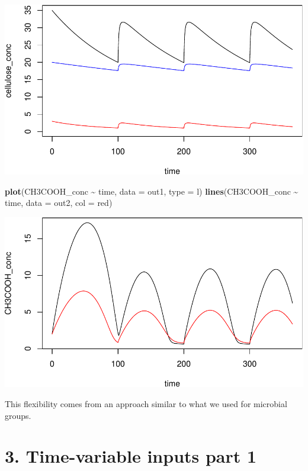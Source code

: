 \documentclass[
]{article}
\newenvironment{Shaded}{\begin{snugshade}}{\end{snugshade}}
\newcommand{\AttributeTok}[1]{\textcolor[rgb]{0.13,0.29,0.53}{#1}}
\newcommand{\FunctionTok}[1]{\textcolor[rgb]{0.13,0.29,0.53}{\textbf{#1}}}
\newcommand{\NormalTok}[1]{#1}
\newcommand{\SpecialCharTok}[1]{\textcolor[rgb]{0.81,0.36,0.00}{\textbf{#1}}}
\newcommand{\StringTok}[1]{\textcolor[rgb]{0.31,0.60,0.02}{#1}}
\begin{document}
\includegraphics{simple_demo_files/figure-latex/unnamed-chunk-13-3.pdf}

\begin{Shaded}
\begin{Highlighting}[]
\FunctionTok{plot}\NormalTok{(CH3COOH\_conc }\SpecialCharTok{\textasciitilde{}}\NormalTok{ time, }\AttributeTok{data =}\NormalTok{ out1, }\AttributeTok{type =} \StringTok{\textquotesingle{}l\textquotesingle{}}\NormalTok{)}
\FunctionTok{lines}\NormalTok{(CH3COOH\_conc }\SpecialCharTok{\textasciitilde{}}\NormalTok{ time, }\AttributeTok{data =}\NormalTok{ out2, }\AttributeTok{col =} \StringTok{\textquotesingle{}red\textquotesingle{}}\NormalTok{)}
\end{Highlighting}
\end{Shaded}

\includegraphics{simple_demo_files/figure-latex/unnamed-chunk-13-4.pdf}

This flexibility comes from an approach similar to what we used for
microbial groups.

\hypertarget{time-variable-inputs-part-1}{%
\section{3. Time-variable inputs part
1}\label{time-variable-inputs-part-1}}
\end{document}
